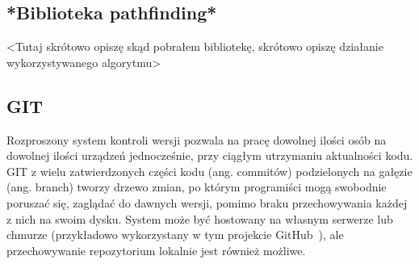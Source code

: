 \subsection{*Biblioteka pathfinding*}
<Tutaj skrótowo opiszę skąd pobrałem bibliotekę, skrótowo opiszę działanie wykorzystywanego algorytmu>

\subsection{GIT}
Rozproszony system kontroli wersji pozwala na pracę dowolnej ilości osób na dowolnej ilości urządzeń jednocześnie, 
przy ciągłym utrzymaniu aktualności kodu.
GIT z wielu zatwierdzonych części kodu (ang. commitów) podzielonych na gałęzie (ang. branch) tworzy drzewo zmian, 
po którym programiści mogą swobodnie 
poruszać się, zaglądać do dawnych wersji, pomimo braku przechowywania każdej z nich na swoim dysku.
System może być hostowany na własnym serwerze lub chmurze (przykładowo wykorzystany w tym projekcie 
GitHub~\cite{github,Halaczkiewicz_SMCEBI_Navigator_GitHub}), 
ale przechowywanie repozytorium lokalnie jest również możliwe.

